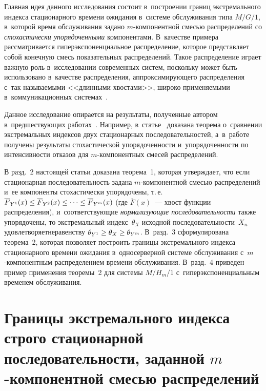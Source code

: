 \begin{multicols}{2}
Главная идея данного  исследования состоит\linebreak
 в~по\-стро\-ении границ экстремального 
индекса стационарного времени ожидания в~сис\-те\-ме обслуживания типа $M/G/1$,  
в~которой время обслуживания  задано $m$-ком\-по\-нент\-ной смесью \mbox{распределений}  со  
\textit{стохастически упорядоченными} компонентами. В~качестве примера 
рассматривается  гиперэкспоненциальное распределение, которое пред\-став\-ля\-ет собой 
конечную смесь показательных распределений. Такое распределение играет важ\-ную 
роль в~исследовании современных сис\-тем, поскольку может быть использовано 
в~качестве распределения, ап\-прок\-си\-ми\-ру\-юще\-го распределения с~так на\-зы\-ва\-емы\-ми
<<длинными хвостами>>,  широко при\-ме\-ня\-емы\-ми в~коммуникационных сис\-те\-мах~\cite{feldman}.

Данное исследование опирается на результаты, полученные автором в~предшествующих 
работах~\cite{dccn2021, tomsk2021, peshkova2022, pesh-mor2022}. Например, в~статье~\cite{peshkova2022} 
доказана теорема  о~сравнении экстремальных индексов двух 
стационарных последовательностей, а~в~работе~\cite{pesh-mor2022}
получены результаты стохастической упорядоченности и~упорядоченности по 
интенсивности отказов для $m$-ком\-по\-нент\-ных смесей распределений.

В разд.~2 настоящей статьи
 доказана  тео\-ре\-ма~1, которая  утверж\-да\-ет, что если стационарная 
последовательность задана $m$-ком\-по\-нент\-ной смесью распределений и~ее компоненты 
стохастически упорядочены,  т.\,е.\  $\overline{F}_{Y^1}(x)\hm\le  \overline{F}_{Y^2}(x) 
\le\cdots\le  \overline{F}_{Y^m}(x)$ (где\linebreak
 $\overline F(x)$~--- хвост 
функции распределения), и~соответствующие \textit{нормализующие последовательности} 
также упорядочены,  то экстремальный индекс~$\theta_X$ исходной 
последовательности~$X_n$ удовлетворяет\linebreak неравенству
 $\theta_{Y^1}\hm\ge \theta_X\hm \ge \theta_{Y^m}$.
 В~разд.~3 сформулирована тео\-ре\-ма~2, которая  позволяет построить 
границы экстремального  индекса  стационарного времени ожидания 
в~односерверной сис\-те\-ме обслуживания с~$m$-ком\-по\-нент\-ным распределением времени 
об\-слу\-живания.
В~разд.~4 приведен   пример применения тео\-ре\-мы~2 для сис\-те\-мы 
$M/H_m/1$ с~гиперэкспоненциальным временем обслуживания.


\section{Границы экстремального индекса строго стационарной последовательности, 
заданной $m$-компонентной смесью распределений}
\label{sec2}


\end{multicols}
